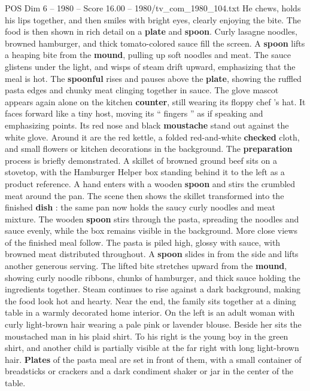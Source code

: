 \begin{textsample}{POS Dim 6 – 1980 – Score 16.00 – 1980/tv\_com\_1980\_104.txt}
He chews, holds his lips together, and then smiles with bright eyes, clearly enjoying the bite.
The food is then shown in rich detail on a \textbf{plate} and \textbf{spoon}.
Curly lasagne noodles, browned hamburger, and thick tomato-colored sauce fill the screen.
A \textbf{spoon} lifts a heaping bite from the \textbf{mound}, pulling up soft noodles and meat.
The sauce glistens under the light, and wisps of steam drift upward, emphasizing that the meal is hot.
The \textbf{spoonful} rises and pauses above the \textbf{plate}, showing the ruffled pasta edges and chunky meat clinging together in sauce.
The glove mascot appears again alone on the kitchen \textbf{counter}, still wearing its floppy chef ’s hat.
It faces forward like a tiny host, moving its “ fingers ” as if speaking and emphasizing points.
Its red nose and black \textbf{moustache} stand out against the white glove.
Around it are the red kettle, a folded red-and-white \textbf{checked} cloth, and small flowers or kitchen decorations in the background.
The \textbf{preparation} process is briefly demonstrated.
A skillet of browned ground beef sits on a stovetop, with the Hamburger Helper box standing behind it to the left as a product reference.
A hand enters with a wooden \textbf{spoon} and stirs the crumbled meat around the pan.
The scene then shows the skillet transformed into the finished \textbf{dish} : the same pan now holds the saucy curly noodles and meat mixture.
The wooden \textbf{spoon} stirs through the pasta, spreading the noodles and sauce evenly, while the box remains visible in the background.
More close views of the finished meal follow.
The pasta is piled high, glossy with sauce, with browned meat distributed throughout.
A \textbf{spoon} slides in from the side and lifts another generous serving.
The lifted bite stretches upward from the \textbf{mound}, showing curly noodle ribbons, chunks of hamburger, and thick sauce holding the ingredients together.
Steam continues to rise against a dark background, making the food look hot and hearty.
Near the end, the family sits together at a dining table in a warmly decorated home interior.
On the left is an adult woman with curly light-brown hair wearing a pale pink or lavender blouse.
Beside her sits the moustached man in his plaid shirt.
To his right is the young boy in the green shirt, and another child is partially visible at the far right with long light-brown hair. \textbf{Plates} of the pasta meal are set in front of them, with a small container of breadsticks or crackers and a dark condiment shaker or jar in the center of the table.

\end{textsample}
